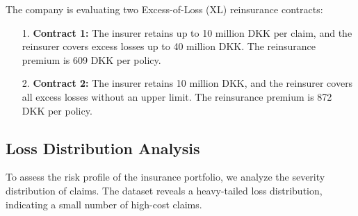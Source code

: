 \documentclass[8pt]{article}
\begin{document}
The company is evaluating two Excess-of-Loss (XL) reinsurance contracts:
\begin{enumerate}
    \item[1.] \textbf{Contract 1:} The insurer retains up to 10 million DKK per claim, and the reinsurer covers excess losses up to 40 million DKK. The reinsurance premium is 609 DKK per policy.
    \item[2.] \textbf{Contract 2:} The insurer retains 10 million DKK, and the reinsurer covers all excess losses without an upper limit. The reinsurance premium is 872 DKK per policy.
\end{enumerate}


\subsection{Loss Distribution Analysis}
To assess the risk profile of the insurance portfolio, we analyze the severity distribution of claims. The dataset reveals a heavy-tailed loss distribution, indicating a small number of high-cost claims.
\end{document}
